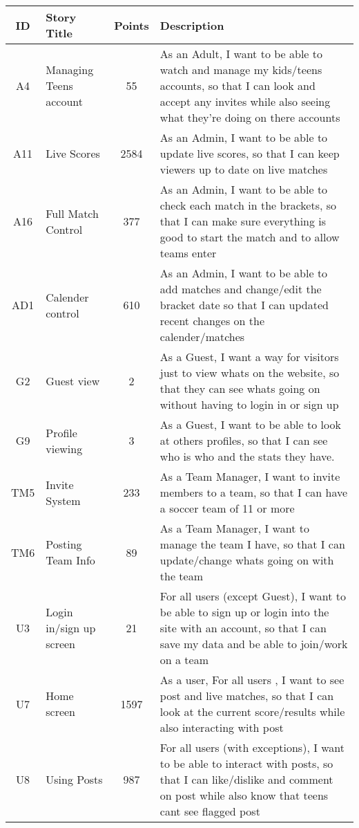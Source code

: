\documentclass{article}
\begin{document}
\begin{table}[h!]
\centering
\begin{tabular}{c l c p{10cm}}
\hline
\textbf{ID} & \textbf{Story Title} & \textbf{Points} & \textbf{Description} \\
\hline
A4 & Managing Teens account & 55 & As an Adult, I want to be able to watch and manage my kids/teens accounts, so that I can look and accept any invites while also seeing what they're doing on there accounts \\ \hline
A11 & Live Scores & 2584 & As an Admin, I want to be able to update live scores, so that I can keep viewers up to date on live matches 
\\ \hline
A16 & Full Match Control & 377 & As an Admin, I want to be able to check each match in the brackets, so that I can make sure everything is good to start the match and to allow teams enter 
\\ \hline
AD1 & Calender control & 610 & As an Admin, I want to be able to add matches and change/edit the bracket date so that I can updated recent changes on the calender/matches 
\\ \hline
G2 & Guest view & 2 & As a Guest, I want a way for visitors just to view whats on the website, so that they can see whats going on without having to login in or sign up \\ \hline
G9 & Profile viewing & 3 & As a Guest, I want to be able to look at others profiles, so that I can see who is who and the stats they have. 
\\ \hline
TM5 & Invite System & 233 & As a Team Manager, I want to invite members to a team, so that I can have a soccer team of 11 or more 
\\ \hline
TM6 & Posting Team Info & 89 & As a Team Manager, I want to manage the team I have, so that I can update/change whats going on with the team
\\ \hline
U3 & Login in/sign up screen & 21 & For all users (except Guest), I want to be able to sign up or login into the site with an account, so that I can save my data and be able to join/work on a team
\\ \hline
U7 & Home screen & 1597 & As a user, For all users , I want to see post and live matches, so that I can look at the current score/results while also interacting with post 
\\ \hline
U8 & Using Posts & 987 & For all users (with exceptions), I want to be able to interact with posts, so that I can like/dislike and comment on post while also know that teens cant see flagged post

\end{tabular}
\end{table}
\end{document}

